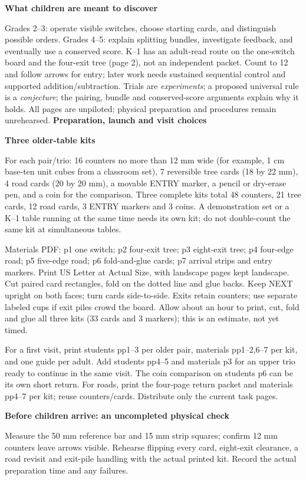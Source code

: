 \documentclass[11pt]{article}
\newcommand{\head}[1]{\vspace{3pt}\textbf{\large #1}\par}
\newcommand{\prob}[1]{\vspace{3pt}\textbf{#1}\par}
\begin{document}
\prob{What children are meant to discover}
Grades 2--3: operate visible switches, choose starting cards, and distinguish possible orders. Grades 4--5: explain splitting bundles, investigate feedback, and eventually use a conserved score. K--1 has an adult-read route on the one-switch board and the four-exit tree (page 2), not an independent packet. Count to 12 and follow arrows for entry; later work needs sustained sequential control and supported addition/subtraction. Trials are \emph{experiments}; a proposed universal rule is a \emph{conjecture}; the pairing, bundle and conserved-score arguments explain why it holds. All pages are unpiloted; physical preparation and procedures remain unrehearsed.
\newpage
\head{Preparation, launch and visit choices}
\prob{Three older-table kits}
For each pair/trio: 16 counters no more than 12 mm wide (for example, 1 cm base-ten unit cubes from a classroom set), 7 reversible tree cards (18 by 22 mm), 4 road cards (20 by 20 mm), a movable ENTRY marker, a pencil or dry-erase pen, and a coin for the comparison. Three complete kits total 48 counters, 21 tree cards, 12 road cards, 3 ENTRY markers and 3 coins. A demonstration set or a K--1 table running at the same time needs its own kit; do not double-count the same kit at simultaneous tables.

Materials PDF: p1 one switch; p2 four-exit tree; p3 eight-exit tree; p4 four-edge road; p5 five-edge road; p6 fold-and-glue cards; p7 arrival strips and entry markers. Print US Letter at Actual Size, with landscape pages kept landscape. Cut paired card rectangles, fold on the dotted line and glue backs. Keep NEXT upright on both faces; turn cards side-to-side. Exits retain counters; use separate labeled cups if exit piles crowd the board. Allow about an hour to print, cut, fold and glue all three kits (33 cards and 3 markers); this is an estimate, not yet timed.

For a first visit, print students pp1--3 per older pair, materials pp1--2,6--7 per kit, and one guide per adult. Add students pp4--5 and materials p3 for an upper trio ready to continue in the same visit. The coin comparison on students p6 can be its own short return. For roads, print the four-page return packet and materials pp4--7 per kit; reuse counters/cards. Distribute only the current task pages.

\prob{Before children arrive: an uncompleted physical check}
Measure the 50 mm reference bar and 15 mm strip squares; confirm 12 mm counters leave arrows visible. Rehearse flipping every card, eight-exit clearance, a road revisit and exit-pile handling with the actual printed kit. Record the actual preparation time and any failures.
\end{document}

